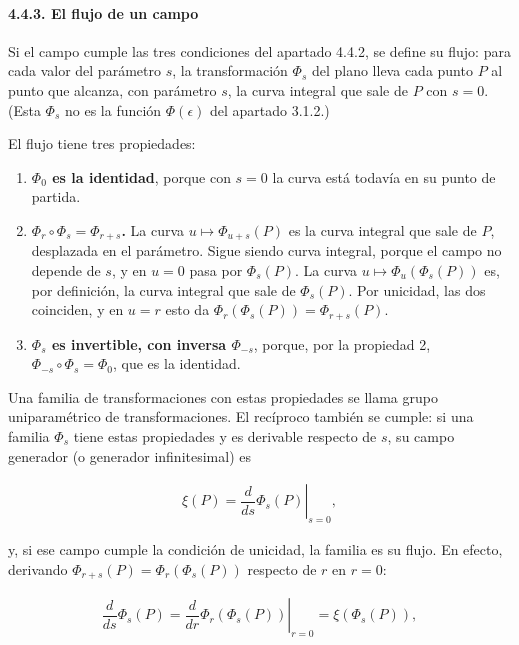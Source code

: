 \documentclass[
  spanish,
]{article}
\providecommand{\tightlist}{%
  \setlength{\itemsep}{0pt}\setlength{\parskip}{0pt}}
\begin{document}
\paragraph{4.4.3. El flujo de un campo}\label{el-flujo-de-un-campo}

Si el campo cumple las tres condiciones del apartado 4.4.2, se define su
flujo: para cada valor del parámetro \(s\), la transformación \(\Phi_s\)
del plano lleva cada punto \(P\) al punto que alcanza, con parámetro
\(s\), la curva integral que sale de \(P\) con \(s = 0\). (Esta
\(\Phi_s\) no es la función \(\Phi(\epsilon)\) del apartado 3.1.2.)

El flujo tiene tres propiedades:

\begin{enumerate}
\def\labelenumi{\arabic{enumi}.}
\tightlist
\item
  \textbf{\(\Phi_0\) es la identidad}, porque con \(s = 0\) la curva
  está todavía en su punto de partida.
\item
  \textbf{\(\Phi_r \circ \Phi_s = \Phi_{r+s}\).} La curva
  \(u \mapsto \Phi_{u+s}(P)\) es la curva integral que sale de \(P\),
  desplazada en el parámetro. Sigue siendo curva integral, porque el
  campo no depende de \(s\), y en \(u = 0\) pasa por \(\Phi_s(P)\). La
  curva \(u \mapsto \Phi_u(\Phi_s(P))\) es, por definición, la curva
  integral que sale de \(\Phi_s(P)\). Por unicidad, las dos coinciden, y
  en \(u = r\) esto da \(\Phi_r(\Phi_s(P)) = \Phi_{r+s}(P)\).
\item
  \textbf{\(\Phi_s\) es invertible, con inversa \(\Phi_{-s}\)}, porque,
  por la propiedad 2, \(\Phi_{-s} \circ \Phi_s = \Phi_0\), que es la
  identidad.
\end{enumerate}

Una familia de transformaciones con estas propiedades se llama grupo
uniparamétrico de transformaciones. El recíproco también se cumple: si
una familia \(\Phi_s\) tiene estas propiedades y es derivable respecto
de \(s\), su campo generador (o generador infinitesimal) es

\[
\begin{aligned}
\xi(P) = \left.\dfrac{d}{ds} \Phi_s(P)\right|_{s=0},
\end{aligned}
\]

y, si ese campo cumple la condición de unicidad, la familia es su flujo.
En efecto, derivando \(\Phi_{r+s}(P) = \Phi_r(\Phi_s(P))\) respecto de
\(r\) en \(r = 0\):

\[
\begin{aligned}
\dfrac{d}{ds} \Phi_s(P) = \left.\dfrac{d}{dr} \Phi_r(\Phi_s(P))\right|_{r=0} = \xi(\Phi_s(P)),
\end{aligned}
\]
\end{document}
